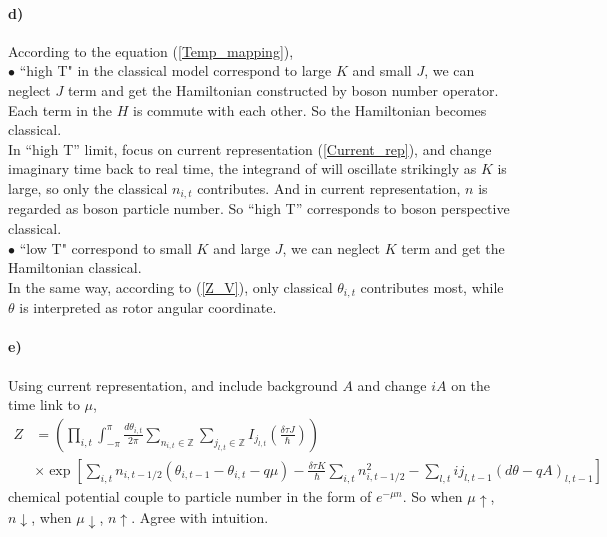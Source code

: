 \paragraph*{d)} According to the equation (\ref{Temp_mapping}), \\
$ \bullet$ ``high T" in the classical model correspond to large $K$ and small $J$, we can neglect $J$ term and get the Hamiltonian constructed by boson number operator. Each term in the $H$ is commute with each other. So the Hamiltonian becomes classical.\\
In ``high T'' limit, focus on current representation (\ref{Current_rep}), and change imaginary time back to real time, the integrand of will oscillate strikingly as $K$ is large, so only the classical $ {n_{i, t}}$ contributes. And in current representation, $n$ is regarded as boson particle number. So ``high T'' corresponds to boson perspective classical.\\
$ \bullet$ ``low T" correspond to small $K$ and large $J$, we can neglect $K$ term and get the Hamiltonian classical. \\
In the same way, according to (\ref{Z_V}), only classical ${\theta_{i,t}}$ contributes most, while $\theta$ is interpreted as rotor angular coordinate.

\paragraph*{e)} Using current representation, and include background $A$ and change $iA$ on the time link to $\mu$,
\begin{equation}
    \begin{aligned}
        Z 
        & = \left(
            \prod_{i, t} \int_{-\pi}^{\pi} \frac{d\theta_{i, t}}{2\pi} 
            \sum_{n_{i, t} \in \mathbb{Z} }
            \sum_{j_{l, t} \in \mathbb{Z} } I_{j_{l, t}}(\frac{\delta \tau J}{\hbar})
            \right)  \\
        & \times \exp \left[ 
            \sum_{i, t} n_{i, t-1/2} (\theta_{i, t-1} - \theta_{i, t} - q\mu)
            -\frac{\delta \tau K}{\hbar} 
            \sum_{i, t} n_{i, t-1/2}^2 
            - \sum_{l, t} ij_{l, t-1}(d\theta - qA)_{l, t-1}
        \right]
    \end{aligned}
\end{equation}
chemical potential couple to particle number in the form of $ e^{-\mu n}$. So when $\mu \uparrow$, $n \downarrow$, when $\mu \downarrow$, $n \uparrow$. Agree with intuition.




